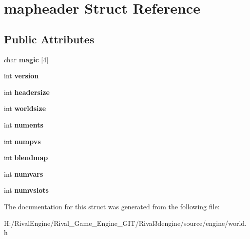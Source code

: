 \hypertarget{structmapheader}{}\section{mapheader Struct Reference}
\label{structmapheader}
\subsection*{Public Attributes}
\begin{DoxyCompactItemize}
\item 
\mbox{\label{structmapheader_adebcac9962f4bf146950b426e97f3250}} 
char {\bfseries magic} \mbox{[}4\mbox{]}
\item 
\mbox{\label{structmapheader_a38a3d094e6c0e1a0634bd2c24927d134}} 
int {\bfseries version}
\item 
\mbox{\label{structmapheader_a85eada31b9c86ca2084a4cc46a8f928f}} 
int {\bfseries headersize}
\item 
\mbox{\label{structmapheader_a6809e773077ef911e38e88cd685951cb}} 
int {\bfseries worldsize}
\item 
\mbox{\label{structmapheader_adb5045c6964b3c9eec03c53d9e0dc748}} 
int {\bfseries numents}
\item 
\mbox{\label{structmapheader_a24451b3d288c1c04c516da2be7f50658}} 
int {\bfseries numpvs}
\item 
\mbox{\label{structmapheader_ad495745c1b72186e99c7dad77e1854c3}} 
int {\bfseries blendmap}
\item 
\mbox{\label{structmapheader_a3cc1ecf734c70c521e23e6ba62ae7b6f}} 
int {\bfseries numvars}
\item 
\mbox{\label{structmapheader_a026cdc8df66921cc6f9434fbf362e61b}} 
int {\bfseries numvslots}
\end{DoxyCompactItemize}


The documentation for this struct was generated from the following file\+:\begin{DoxyCompactItemize}
\item 
H\+:/\+Rival\+Engine/\+Rival\+\_\+\+Game\+\_\+\+Engine\+\_\+\+G\+I\+T/\+Rival3dengine/source/engine/world.\+h\end{DoxyCompactItemize}

